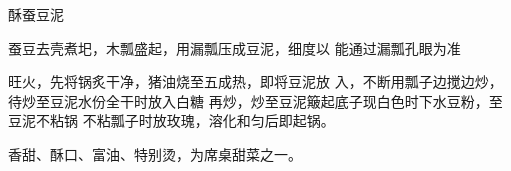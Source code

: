 \begin{recipe}{酥蚕豆泥}

\ingredients


\cooking

\step 	蚕豆去壳煮圯，木瓢盛起，用漏瓢压成豆泥，细度以 能通过漏瓢孔眼为准

\step 	旺火，先将锅炙干净，猪油烧至五成热，即将豆泥放 入，不断用瓢子边搅边炒，待炒至豆泥水份全干时放入白糖 再炒，炒至豆泥簸起底子现白色时下水豆粉，至豆泥不粘锅 不粘瓢子时放玫瑰，溶化和匀后即起锅。

\notes

香甜、酥口、富油、特别烫，为席桌甜菜之一。

\end{recipe}

